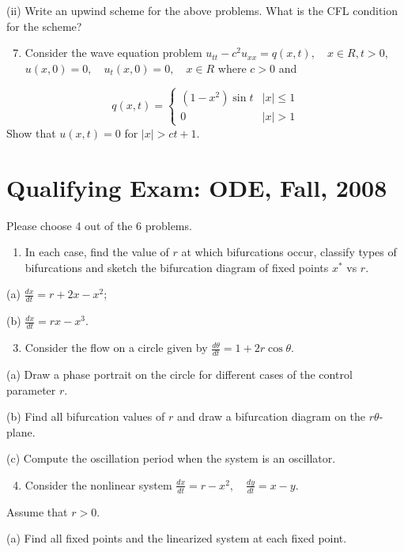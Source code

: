 \documentclass[10pt]{article}
\begin{document}
(ii) Write an upwind scheme for the above problems. What is the CFL condition for the scheme?

\begin{enumerate}
  \setcounter{enumi}{6}
  \item Consider the wave equation problem $u_{t t}-c^{2} u_{x x}=q(x, t), \quad x \in R, t>0$, $u(x, 0)=0, \quad u_{t}(x, 0)=0, \quad x \in R$ where $c>0$ and
\end{enumerate}
$$
q(x, t)= \begin{cases}\left(1-x^{2}\right) \sin t & |x| \leq 1 \\ 0 & |x|>1\end{cases}
$$
Show that $u(x, t)=0$ for $|x|>c t+1$.

\section{Qualifying Exam: ODE, Fall, 2008}
Please choose 4 out of the 6 problems.

\begin{enumerate}
  \item In each case, find the value of $r$ at which bifurcations occur, classify types of bifurcations and sketch the bifurcation diagram of fixed points $x^{*}$ vs $r$.
\end{enumerate}
(a) $\frac{d x}{d t}=r+2 x-x^{2}$;

(b) $\frac{d x}{d t}=r x-x^{3}$.

\begin{enumerate}
  \setcounter{enumi}{2}
  \item Consider the flow on a circle given by $\frac{d \theta}{d t}=1+2 r \cos \theta$.
\end{enumerate}
(a) Draw a phase portrait on the circle for different cases of the control parameter $r$.

(b) Find all bifurcation values of $r$ and draw a bifurcation diagram on the $r \theta$-plane.

(c) Compute the oscillation period when the system is an oscillator.

\begin{enumerate}
  \setcounter{enumi}{3}
  \item Consider the nonlinear system $\frac{d x}{d t}=r-x^{2}, \quad \frac{d y}{d t}=x-y$.
\end{enumerate}
Assume that $r>0$.

(a) Find all fixed points and the linearized system at each fixed point.
\end{document}
